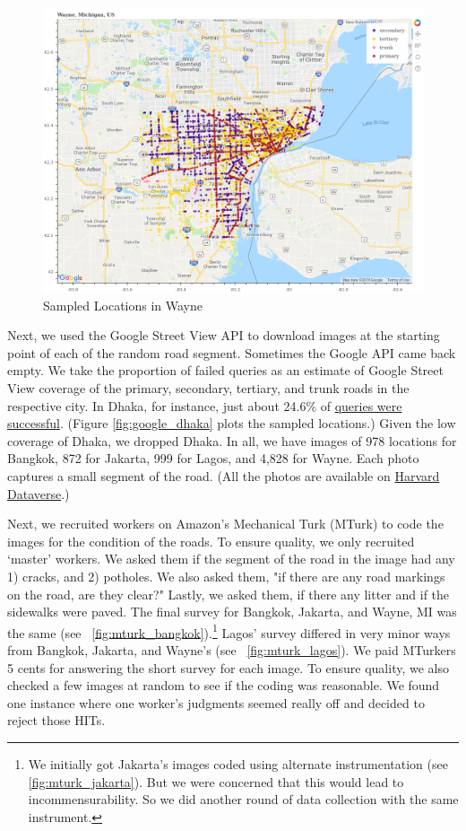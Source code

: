 \documentclass[12pt, letterpaper]{article}
\begin{document}
\begin{figure}[H]
\centering
\caption{Sampled Locations in Wayne} \label{google_wayne2}
    \includegraphics[width=\textwidth]{../figs/wayne2-gmap.png}
\end{figure}

Next, we used the Google Street View API to download images at the starting point of each of the random road segment. Sometimes the Google API came back empty. We take the proportion of failed queries as an estimate of Google Street View coverage of the primary, secondary, tertiary, and trunk roads in the respective city. In Dhaka, for instance, just about 24.6\% of \href{https://github.com/geosensing/streetsense/scripts/google\_street\_view_Mturk-Dhaka.ipynb}{queries were successful}. (Figure \ref{fig:google_dhaka} plots the sampled locations.) Given the low coverage of Dhaka, we dropped Dhaka. In all, we have images of 978 locations for Bangkok, 872 for Jakarta, 999 for Lagos, and 4,828 for Wayne. Each photo captures a small segment of the road. (All the photos are available on \href{https://dataverse.harvard.edu/dataset.xhtml?persistentId=doi:10.7910/DVN/L3HN0K}{Harvard Dataverse}.)

Next, we recruited workers on Amazon's Mechanical Turk (MTurk) to code the images for the condition of the roads. To ensure quality, we only recruited `master' workers. We asked them if the segment of the road in the image had any 1) cracks, and 2) potholes. We also asked them, "if there are any road markings on the road, are they clear?" Lastly, we asked them, if there any litter and if the sidewalks were paved. The final survey for Bangkok, Jakarta, and Wayne, MI was the same (see ~\ref{fig:mturk_bangkok}).\footnote{We initially got Jakarta's images coded using alternate instrumentation (see \ref{fig:mturk_jakarta}). But we were concerned that this would lead to incommensurability. So we did another round of data collection with the same instrument.} Lagos' survey differed in very minor ways from Bangkok, Jakarta, and Wayne's (see ~\ref{fig:mturk_lagos}). We paid MTurkers 5 cents for answering the short survey for each image. To ensure quality, we also checked a few images at random to see if the coding was reasonable. We found one instance where one worker's judgments seemed really off and decided to reject those HITs.
\end{document}
